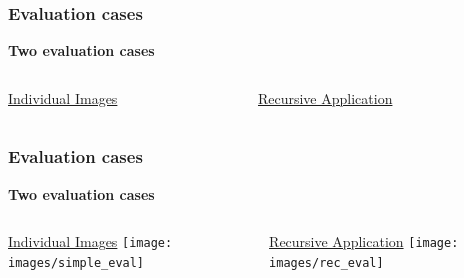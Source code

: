 \documentclass[18pt]{beamer}
\begin{document}
\begin{frame}[t]
  \frametitle{Evaluation cases}
  \begin{center}
    \textbf{\Large Two evaluation cases}
  \end{center}
  \vspace{-1cm}
  \begin{columns}[t]
    \begin{column}{0.5\textwidth}
      \begin{center}
        {\large \underline{Individual Images}}
      \end{center}
    \end{column}
    \begin{column}{0.5\textwidth}
      \begin{center}
        {\large \underline{Recursive Application}}
        \end{center}
    \end{column}
  \end{columns}
\end{frame}


\begin{frame}[t]
  \frametitle{Evaluation cases}
  \begin{center}
    \textbf{\Large Two evaluation cases}
  \end{center}
  \vspace{-1cm}
  \begin{columns}[t]
    \begin{column}{0.5\textwidth}
      \begin{center}
        {\large \underline{Individual Images}}
        \texttt{[image: images/simple\_eval]}
      \end{center}
    \end{column}
    \begin{column}{0.5\textwidth}
      \begin{center}
        {\large \underline{Recursive Application}}
        \texttt{[image: images/rec\_eval]}
      \end{center}
    \end{column}
  \end{columns}
\end{frame}
\end{document}

